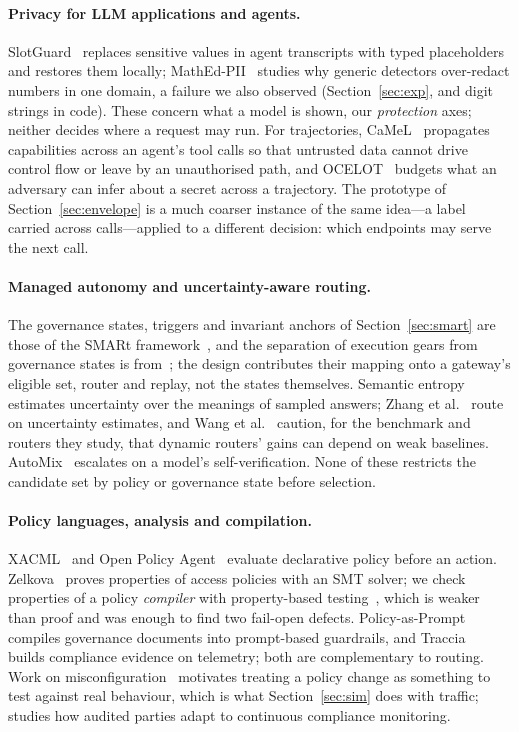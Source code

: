 \documentclass[11pt]{article}
\begin{document}
\paragraph{Privacy for LLM applications and agents.} SlotGuard~\cite{slotguard} replaces
sensitive values in agent transcripts with typed placeholders and restores them locally;
MathEd-PII~\cite{mathedpii} studies why generic detectors over-redact numbers in one domain, a
failure we also observed (Section~\ref{sec:exp}, and digit strings in code). These concern what a
model is shown, our \emph{protection} axes; neither decides where a request may run. For
trajectories, CaMeL~\cite{camel} propagates capabilities across an agent's tool calls so that
untrusted data cannot drive control flow or leave by an unauthorised path, and
OCELOT~\cite{ocelot} budgets what an adversary can infer about a secret across a trajectory. The
prototype of Section~\ref{sec:envelope} is a much coarser instance of the same idea---a label
carried across calls---applied to a different decision: which endpoints may serve the next call.

\paragraph{Managed autonomy and uncertainty-aware routing.} The governance states, triggers and
invariant anchors of Section~\ref{sec:smart} are those of the SMARt
framework~\cite{smartma,smartbounded}, and the separation of execution gears from governance
states is from~\cite{smartgears}; the design contributes their mapping onto a gateway's eligible
set, router and replay, not the states themselves. Semantic entropy~\cite{semanticentropy}
estimates uncertainty over the meanings of sampled answers; Zhang et al.~\cite{uncertaintyrouting}
route on uncertainty estimates, and Wang et al.~\cite{misguided} caution, for the benchmark and
routers they study, that dynamic routers' gains can depend on weak baselines. AutoMix~\cite{automix}
escalates on a model's self-verification. None of these restricts the candidate set by policy
or governance state before selection.

\paragraph{Policy languages, analysis and compilation.} XACML~\cite{xacml} and Open Policy
Agent~\cite{opa} evaluate declarative policy before an action. Zelkova~\cite{zelkova} proves
properties of access policies with an SMT solver; we check properties of a policy
\emph{compiler} with property-based testing~\cite{quickcheck,hypothesis}, which is weaker than
proof and was enough to find two fail-open defects. Policy-as-Prompt~\cite{policyasprompt}
compiles governance documents into prompt-based guardrails, and Traccia~\cite{traccia} builds
compliance evidence on telemetry; both are complementary to routing. Work on
misconfiguration~\cite{xu2013,yin2011} motivates treating a policy change as something to test
against real behaviour, which is what Section~\ref{sec:sim} does with traffic;
\cite{auditgaming} studies how audited parties adapt to continuous compliance monitoring.
\end{document}
